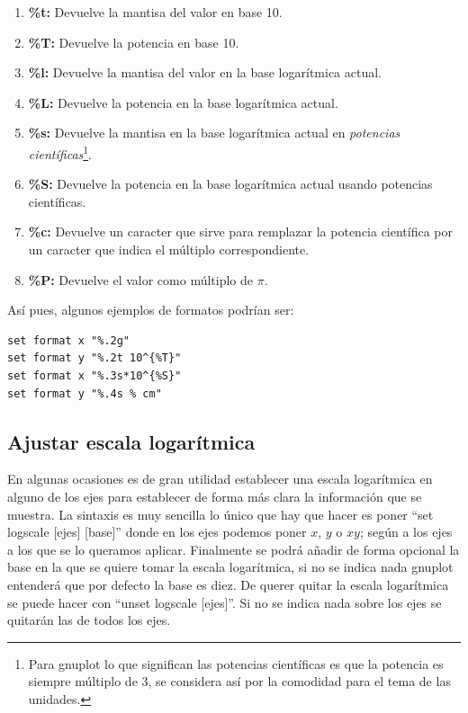 \documentclass[11pt,a4paper,twoside,pdf]{article}
\numberwithin{equation}{section}
\begin{document}
\begin{enumerate}
	\item \textbf{\%t:} Devuelve la mantisa del valor en base 10.
	\item \textbf{\%T:} Devuelve la potencia en base 10.
	\item \textbf{\%l:} Devuelve la mantisa del valor en la base logarítmica actual.
	\item \textbf{\%L:} Devuelve la potencia en la base logarítmica actual.
	\item \textbf{\%s:} Devuelve la mantisa en la base logarítmica actual en \textit{potencias científicas}\footnote{Para gnuplot lo que significan las potencias científicas es que la potencia es siempre múltiplo de 3, se considera así por la comodidad para el tema de las unidades.}.
	\item \textbf{\%S:} Devuelve la potencia en la base logarítmica actual usando potencias científicas.
	\item \textbf{\%c:} Devuelve un caracter que sirve para remplazar la potencia científica por un caracter que indica el múltiplo correspondiente.
	\item \textbf{\%P:} Devuelve el valor como múltiplo de $\pi$.
\end{enumerate}

Así pues, algunos ejemplos de formatos podrían ser:

\begin{lstlisting}[language=Gnuplot]
set format x "%.2g"
set format y "%.2t 10^{%T}"
set format x "%.3s*10^{%S}"
set format y "%.4s % cm"
\end{lstlisting}

\subsection{Ajustar escala logarítmica}

En algunas ocasiones es de gran utilidad establecer una escala logarítmica en alguno de los ejes para establecer de forma más clara la información que se muestra. La sintaxis es muy sencilla lo único que hay que hacer es poner ``set logscale [ejes] [base]'' donde en los ejes podemos poner $x$, $y$ o $xy$; según a los ejes a los que se lo queramos aplicar. Finalmente se podrá añadir de forma opcional la base en la que se quiere tomar la escala logarítmica, si no se indica nada gnuplot entenderá que por defecto la base es diez. De querer quitar la escala logarítmica se puede hacer con ``unset logscale [ejes]''. Si no se indica nada sobre los ejes se quitarán las de todos los ejes.\\
\end{document}
